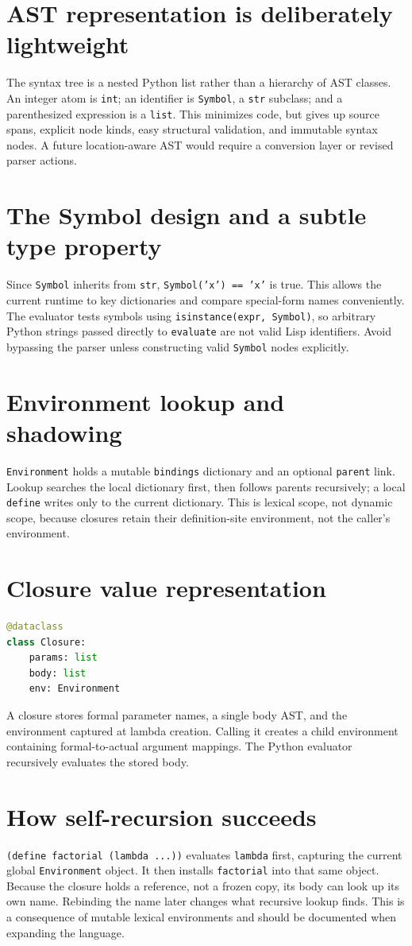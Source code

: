 \documentclass[11pt,a4paper,oneside]{report}
\begin{document}
\section{AST representation is deliberately lightweight}
The syntax tree is a nested Python list rather than a hierarchy of AST classes. An integer atom is \texttt{int}; an identifier is \texttt{Symbol}, a \texttt{str} subclass; and a parenthesized expression is a \texttt{list}. This minimizes code, but gives up source spans, explicit node kinds, easy structural validation, and immutable syntax nodes. A future location-aware AST would require a conversion layer or revised parser actions.
\section{The Symbol design and a subtle type property}
Since \texttt{Symbol} inherits from \texttt{str}, \texttt{Symbol('x') == 'x'} is true. This allows the current runtime to key dictionaries and compare special-form names conveniently. The evaluator tests symbols using \texttt{isinstance(expr, Symbol)}, so arbitrary Python strings passed directly to \texttt{evaluate} are not valid Lisp identifiers. Avoid bypassing the parser unless constructing valid \texttt{Symbol} nodes explicitly.
\section{Environment lookup and shadowing}
\texttt{Environment} holds a mutable \texttt{bindings} dictionary and an optional \texttt{parent} link. Lookup searches the local dictionary first, then follows parents recursively; a local \texttt{define} writes only to the current dictionary. This is lexical scope, not dynamic scope, because closures retain their definition-site environment, not the caller's environment.
\section{Closure value representation}
\begin{lstlisting}[language=Python]
@dataclass
class Closure:
    params: list
    body: list
    env: Environment
\end{lstlisting}
A closure stores formal parameter names, a single body AST, and the environment captured at lambda creation. Calling it creates a child environment containing formal-to-actual argument mappings. The Python evaluator recursively evaluates the stored body.
\section{How self-recursion succeeds}
\texttt{(define factorial (lambda ...))} evaluates \texttt{lambda} first, capturing the current global \texttt{Environment} object. It then installs \texttt{factorial} into that same object. Because the closure holds a reference, not a frozen copy, its body can look up its own name. Rebinding the name later changes what recursive lookup finds. This is a consequence of mutable lexical environments and should be documented when expanding the language.
\end{document}
